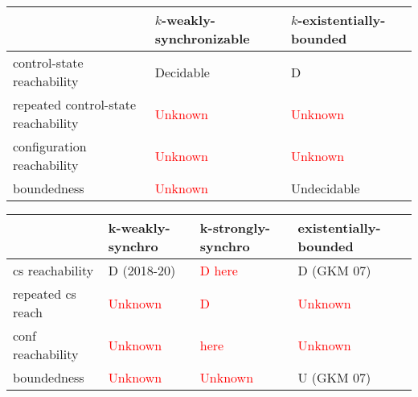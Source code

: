 \documentclass[a4paper,UKenglish,cleveref, autoref, thm-restate]{lipics-v2021}
\begin{document}



\iffalse


\begin{center}
	\begin{tabular}{| l | l | l| }
		\hline
		& $k$-weakly-synchronizable   & $k$-existentially-bounded \\ \hline

		control-state reachability  & Decidable \cite{DBLP:journals/corr/abs-1804-06612,DBLP:conf/fossacs/GiustoLL20}  & D \cite{GKM07} \\  \hline

		repeated control-state  reachability &  \textcolor{red}{Unknown}   &  \textcolor{red}{Unknown}  \\  \hline

		configuration reachability &  \textcolor{red}{Unknown}  &  \textcolor{red}{Unknown} \\
		\hline
		boundedness &   \textcolor{red}{Unknown}  & Undecidable  \cite{GKM07}  \\
		\hline
	\end{tabular}
\end{center}

\begin{center}
	\begin{tabular}{| l | l | l | l| }
		\hline
		& k-weakly-synchro  & k-strongly-synchro & existentially-bounded \\ \hline

		cs   reachability & D (2018-20) &  \textcolor{red}{D here} & D (GKM 07) \\  \hline

		repeated cs   reach &  \textcolor{red}{Unknown} &  \textcolor{red}{D}   &  \textcolor{red}{Unknown}  \\  \hline

		conf reachability &  \textcolor{red}{Unknown} &   \textcolor{red}{here } &  \textcolor{red}{Unknown} \\
		\hline
		boundedness &   \textcolor{red}{Unknown} & \textcolor{red}{Unknown } & U  (GKM 07)  \\
		\hline
	\end{tabular}
\end{center}
\end{document}
